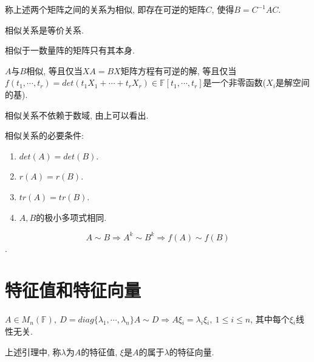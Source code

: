 \begin{definition}[相似]
    称上述两个矩阵之间的关系为相似, 即存在可逆的矩阵$C$, 使得$B=C^{-1}AC$.
\end{definition}

\begin{statement}
    相似关系是等价关系.
\end{statement}

\begin{example}
    相似于一数量阵的矩阵只有其本身.
\end{example}

\begin{example}
    $A$与$B$相似, 等且仅当$XA=BX$矩阵方程有可逆的解, 等且仅当$f(t_1, \cdots, t_r)=det(t_1X_1+\cdots+t_rX_r)\in \mathbb{F}[t_1, \cdots, t_r]$是一个非零函数($X_i$是解空间的基).
\end{example}

\begin{statement}
    相似关系不依赖于数域, 由上可以看出.
\end{statement}

\begin{property}
    相似关系的必要条件:
    \begin{enumerate}[itemindent=1em]
        \item $det(A)=det(B)$.
        \item $r(A)=r(B)$.
        \item $tr(A)=tr(B)$.
        \item $A, B$的极小多项式相同.
    \end{enumerate}
\end{property}

\begin{lemma}
    \[A\sim B\Longrightarrow A^k\sim B^k\Longrightarrow f(A)\sim f(B)\].
\end{lemma}

\section{ 特征值和特征向量 }

\begin{lemma}
    $A\in M_n(\mathbb{F}), \ D=diag\{\lambda{_1}, \cdots, \lambda{_n}\} A\sim D\Longrightarrow A\xi{_i}=\lambda{_i}\xi{_i}, \ 1\le i \le n$, 其中每个$\xi{_i}$线性无关.
\end{lemma}

\begin{definition}[特征向量]
    上述引理中, 称$\lambda$为$A$的特征值, $\xi$是$A$的属于$\lambda$的特征向量.
\end{definition}

